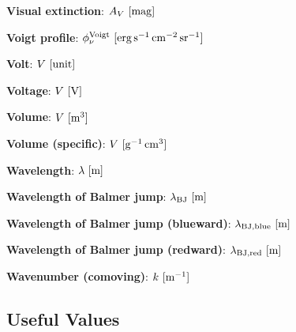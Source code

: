 \documentclass[a4paper,10pt]{article}
\begin{document}
{\noindent}\textbf{Visual extinction}: $A_V ~ [{\rm mag}]$

{\noindent}\textbf{Voigt profile}: $\phi_\nu^{\rm Voigt}  ~ [{\rm erg\,s^{-1}\,cm^{-2}\,sr^{-1}}]$

{\noindent}\textbf{Volt}: $V ~ [{\rm unit}]$

{\noindent}\textbf{Voltage}: $V ~ [{\rm V}]$

{\noindent}\textbf{Volume}: $V ~ [{\rm m^3}]$

{\noindent}\textbf{Volume (specific)}: $V ~ [{\rm g^{-1}\,cm^3}]$

{\noindent}\textbf{Wavelength}: $\lambda ~ [{\rm m}]$

{\noindent}\textbf{Wavelength of Balmer jump}: $\lambda_{\rm BJ} ~ [{\rm m}]$

{\noindent}\textbf{Wavelength of Balmer jump (blueward)}: $\lambda_{\rm BJ,blue} ~ [{\rm m}]$

{\noindent}\textbf{Wavelength of Balmer jump (redward)}: $\lambda_{\rm BJ,red} ~ [{\rm m}]$

{\noindent}\textbf{Wavenumber (comoving)}: $k ~ [{\rm m^{-1}}]$






































\newpage
\subsection{Useful Values}
\end{document}
